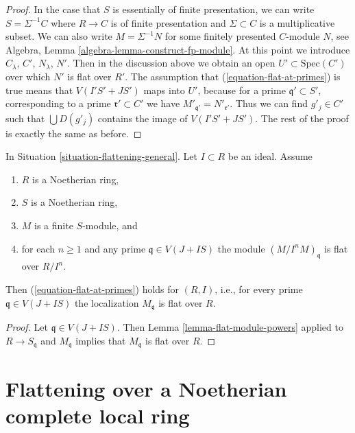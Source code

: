 \begin{proof}
\medskip\noindent
In the case that $S$ is essentially of finite presentation, we can write
$S = \Sigma^{-1}C$ where $R \to C$ is of finite presentation and
$\Sigma \subset C$ is a multiplicative subset. We can also write
$M = \Sigma^{-1}N$ for some finitely presented $C$-module $N$, see
Algebra, Lemma \ref{algebra-lemma-construct-fp-module}.
At this point we introduce $C_\lambda$, $C'$, $N_\lambda$, $N'$. Then in
the discussion above we obtain an open $U' \subset \text{Spec}(C')$
over which $N'$ is flat over $R'$. The assumption that
(\ref{equation-flat-at-primes}) is true means that $V(I'S' + JS')$ maps
into $U'$, because for a prime $\mathfrak q' \subset S'$, corresponding
to a prime $\mathfrak r' \subset C'$ we have
$M'_{\mathfrak q'} = N'_{\mathfrak r'}$. Thus we can find
$g'_j \in C'$ such that $\bigcup D(g'_j)$ contains the image of
$V(I'S' + JS')$. The rest of the proof is exactly the same as before.
\end{proof}

\begin{lemma}
\label{lemma-flat-module-powers-variant}
In Situation \ref{situation-flattening-general}.
Let $I \subset R$ be an ideal. Assume
\begin{enumerate}
\item $R$ is a Noetherian ring,
\item $S$ is a Noetherian ring,
\item $M$ is a finite $S$-module, and
\item for each $n \geq 1$ and any prime
$\mathfrak q \in V(J + IS)$ the module $(M/I^n M)_{\mathfrak q}$
is flat over $R/I^n$.
\end{enumerate}
Then (\ref{equation-flat-at-primes}) holds for $(R, I)$, i.e.,
for every prime $\mathfrak q \in V(J + IS)$
the localization $M_{\mathfrak q}$ is flat over $R$.
\end{lemma}

\begin{proof}
Let $\mathfrak q \in V(J + IS)$. Then
Lemma \ref{lemma-flat-module-powers}
applied to $R \to S_{\mathfrak q}$ and $M_{\mathfrak q}$
implies that $M_{\mathfrak q}$ is flat over $R$.
\end{proof}










\section{Flattening over a Noetherian complete local ring}
\label{section-flattening-Noetherian-complete-local}

